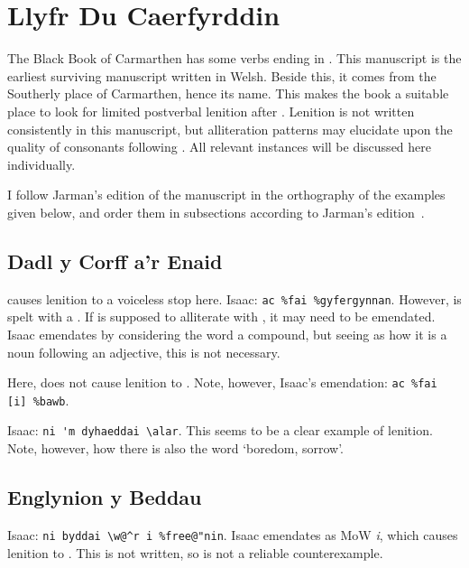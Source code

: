 \section{Llyfr Du Caerfyrddin}
The Black Book of Carmarthen has some verbs ending in \ei. This manuscript is the earliest surviving manuscript written  in Welsh. Beside this, it comes from the Southerly place of Carmarthen, hence its name. This makes the book a suitable place to look for limited postverbal lenition after \ei. Lenition is not written consistently in this manuscript, but alliteration patterns may elucidate upon the quality of consonants following \ei. All relevant instances will be discussed here individually. 

I follow Jarman's edition of the manuscript in the orthography of the examples given below, and order them in subsections according to Jarman's edition~\parencite{jarman_llyfr_1982}.

\subsection{Dadl y Corff a'r Enaid}
 causes lenition to a voiceless stop here. Isaac: \verb|ac %fai %gyfergynnan|. However,  is spelt with a . If  is supposed to alliterate with , it may need to be emendated. Isaac emendates by considering the word a compound, but seeing as how it is a noun following an adjective, this is not necessary.

Here,  does not cause lenition to . Note, however, Isaac's emendation: \verb|ac %fai [i] %bawb|.

Isaac: \verb|ni 'm dyhaeddai \alar|. This seems to be a clear example of lenition. Note, however, how there is also the word  `boredom, sorrow'.
\subsection{Englynion y Beddau}
Isaac: \verb|ni byddai \w@^r i %free@"nin|. Isaac emendates  as MoW \textit{i}, which causes lenition to . This is not written, so  is not a reliable counterexample.

